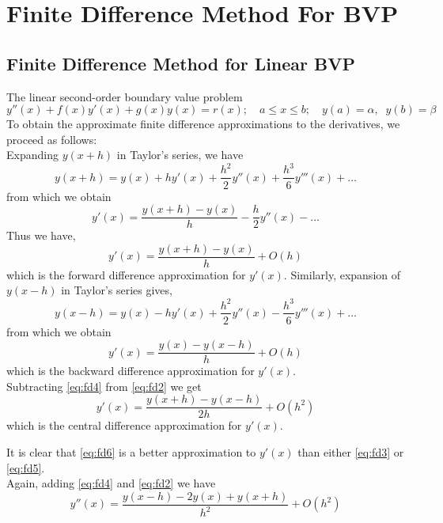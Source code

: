 \documentclass[../main-sheet.tex]{subfiles}
\begin{document}
\chapter{Finite Difference Method For BVP}
\section{Finite Difference Method for Linear BVP}
The linear second-order boundary value problem
\begin{equation}
    y''(x)+f(x)y'(x)+g(x)y(x)=r(x);\quad a\leq x\leq b;\quad y(a)=\alpha,\;\;y(b)=\beta
    \label{eq:fd1}
\end{equation}
To obtain the approximate finite difference approximations to the derivatives, we proceed as follows:\\
Expanding \(y(x+h)\) in Taylor's series, we have
\begin{equation}
    y(x+h)=y(x)+hy'(x)+\frac{h^2}{2}y''(x)+\frac{h^3}{6}y'''(x)+\dots
    \label{eq:fd2}
\end{equation}
from which we obtain
\[
    y'(x)=\frac{y(x+h)-y(x)}{h}-\frac{h}{2}y''(x)-\dots
\]
Thus we have,
\begin{equation}
    y'(x)=\frac{y(x+h)-y(x)}{h}+O(h)
    \label{eq:fd3}
\end{equation}
which is the forward difference approximation for \(y'(x)\). Similarly, expansion of \(y(x-h)\) in Taylor's series gives,
\begin{equation}
    y(x-h)=y(x)-hy'(x)+\frac{h^2}{2}y''(x)-\frac{h^3}{6}y'''(x)+\dots
    \label{eq:fd4}
\end{equation}
from which we obtain
\begin{equation}
    y'(x)=\frac{y(x)-y(x-h)}{h}+O(h)
    \label{eq:fd5}
\end{equation}
which is the backward difference approximation for \(y'(x)\).\\
Subtracting \eqref{eq:fd4} from \eqref{eq:fd2} we get
\begin{equation}
    y'(x)=\frac{y(x+h)-y(x-h)}{2h}+O(h^2)
    \label{eq:fd6}
\end{equation}
which is the central difference approximation for \(y'(x)\).

It is clear that \eqref{eq:fd6} is a better approximation to \(y'(x)\) than either \eqref{eq:fd3} or \eqref{eq:fd5}.\\
Again, adding \eqref{eq:fd4} and \eqref{eq:fd2} we have
\begin{equation}
    y''(x)=\frac{y(x-h)-2y(x)+y(x+h)}{h^2}+O(h^2)
    \label{eq:fd7}
\end{equation}
\end{document}
